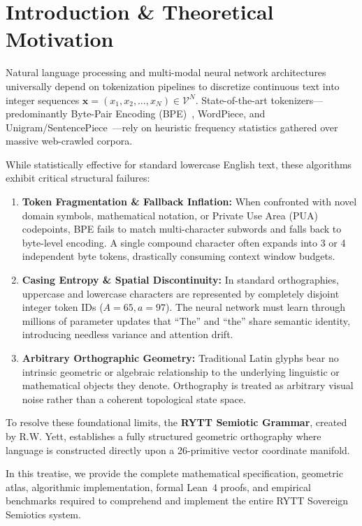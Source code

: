 \documentclass[11pt,oneside,letterpaper]{article}
\theoremstyle{sovereignstyle}
\begin{document}
\section{Introduction \& Theoretical Motivation}

Natural language processing and multi-modal neural network architectures universally depend on tokenization pipelines to discretize continuous text into integer sequences $\mathbf{x} = (x_1, x_2, \dots, x_N) \in \mathcal{V}^N$. State-of-the-art tokenizers---predominantly Byte-Pair Encoding (BPE)~\cite{sennrich2016bpe}, WordPiece, and Unigram/SentencePiece~\cite{kudo2018subword}---rely on heuristic frequency statistics gathered over massive web-crawled corpora. 

While statistically effective for standard lowercase English text, these algorithms exhibit critical structural failures:
\begin{enumerate}
  \item \textbf{Token Fragmentation \& Fallback Inflation:} When confronted with novel domain symbols, mathematical notation, or Private Use Area (PUA) codepoints, BPE fails to match multi-character subwords and falls back to byte-level encoding. A single compound character often expands into 3 or 4 independent byte tokens, drastically consuming context window budgets.
  \item \textbf{Casing Entropy \& Spatial Discontinuity:} In standard orthographies, uppercase and lowercase characters are represented by completely disjoint integer token IDs ($A = 65, a = 97$). The neural network must learn through millions of parameter updates that ``The'' and ``the'' share semantic identity, introducing needless variance and attention drift.
  \item \textbf{Arbitrary Orthographic Geometry:} Traditional Latin glyphs bear no intrinsic geometric or algebraic relationship to the underlying linguistic or mathematical objects they denote. Orthography is treated as arbitrary visual noise rather than a coherent topological state space.
\end{enumerate}

To resolve these foundational limits, the \textbf{RYTT Semiotic Grammar}, created by R.W. Yett, establishes a fully structured geometric orthography where language is constructed directly upon a 26-primitive vector coordinate manifold. 

In this treatise, we provide the complete mathematical specification, geometric atlas, algorithmic implementation, formal Lean~4 proofs, and empirical benchmarks required to comprehend and implement the entire RYTT Sovereign Semiotics system.
\end{document}
